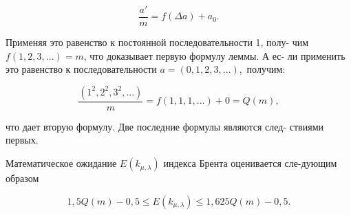 \begin{myproof}
 $$\frac{a'}{m} = f(\Delta a) + a_{0}.$$ \par
 
\noindent Применяя это равенство к постоянной последовательности 1, полу- \linebreak чим $f(1,2,3,...) = m$, \noindent что доказывает первую формулу леммы. А ес- \linebreak ли применить это равенство к последовательности $a =(0,1,2,3,...),$ получим: \par 
 
 $$\frac{(1^{2}, 2^{2}, 3^{2},...)}{m} = f(1,1,1,...) + 0 = Q(m),$$ \par 
 что дает вторую формулу. Две последние формулы являются след- \linebreak ствиями первых. \par
\end{myproof}
\begin{predl} 
 \slshape{Математическое ожидание $E(k_{\mu, \lambda})$ индекса Брента оценивается сле-\linebreak дующим образом \par }
 
 $$1,5Q(m) - 0,5 \leqslant E(k_{\mu, \lambda}) \leqslant 1,625Q(m) - 0,5.$$ \par 
 \end{predl}
